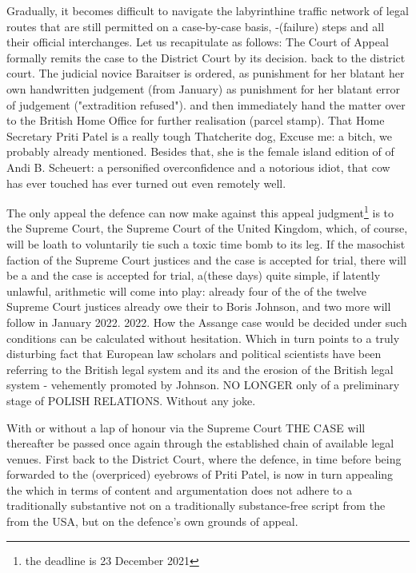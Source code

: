 \begin{multicols}{2}
Gradually, it becomes difficult to navigate the labyrinthine traffic network of legal routes that
are still permitted on a case-by-case basis,
-(failure) steps and all their official interchanges. Let us recapitulate as follows: The Court of
 Appeal formally remits the case to the District Court by its decision. back to the district court.
 The judicial novice Baraitser is ordered, as punishment for her blatant her own handwritten
 judgement (from January) as punishment for her blatant error of judgement ("extradition refused").
 and then immediately hand the matter over to the British Home Office for further realisation
 (parcel stamp). That Home Secretary Priti Patel is a really tough Thatcherite dog, Excuse me: a
 bitch, we probably already mentioned. Besides that, she is the female island edition of of Andi B.
 Scheuert: a personified overconfidence and a notorious idiot, that cow has ever touched has ever
 turned out even remotely well.

The only appeal the defence can now make against this appeal judgment\footnote[36]{the deadline is
23 December 2021} is to the Supreme Court, the Supreme Court of the United Kingdom, which, of
course, will be loath to voluntarily tie such a toxic time bomb to its leg. If the masochist
faction of the Supreme Court justices and the case is accepted for trial, there will be a and the
case is accepted for trial, a(these days) quite simple, if latently unlawful, arithmetic will come
into play: already four of the of the twelve Supreme Court justices already owe their to Boris
Johnson, and two more will follow in January 2022. 2022. How the Assange case would be decided
under such conditions can be calculated without hesitation. Which in turn points to a truly
disturbing fact that European law scholars and political scientists have been referring to the
British legal system and its and the erosion of the British legal system - vehemently promoted by
Johnson. NO LONGER only of a preliminary stage of POLISH RELATIONS. Without any joke.

With or without a lap of honour via the Supreme Court THE CASE will thereafter be passed once again
through the established chain of available legal venues. First back to the District Court, where
the defence, in time before being forwarded to the (overpriced) eyebrows of Priti Patel, is now in
turn appealing the %
which in terms of content and argumentation does not adhere to a traditionally substantive not on a
traditionally substance-free script from the from the USA, but on the defence's own grounds of
appeal.


\end{multicols}
